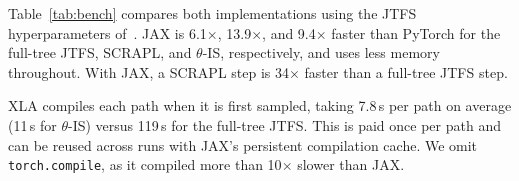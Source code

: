 \documentclass{article}
\begin{document}
\begin{sloppy}
Table~\ref{tab:bench} compares both implementations using the JTFS hyperparameters of~\cite{mitcheltree2026scrapl}.
JAX is 6.1$\times$, 13.9$\times$, and 9.4$\times$ faster than PyTorch for the full-tree JTFS, SCRAPL, and $\theta$-IS, respectively, and uses less memory throughout.
With JAX, a SCRAPL step is 34$\times$ faster than a full-tree JTFS step.

XLA compiles each path when it is first sampled, taking 7.8\,s per path on average (11\,s for $\theta$-IS) versus 119\,s for the full-tree JTFS.
This is paid once per path and can be reused across runs with JAX's persistent compilation cache.
We omit \texttt{torch.compile}, as it compiled more than 10$\times$ slower than JAX.


\vspace{-5pt}
{\footnotesize}

\end{sloppy}
\end{document}
